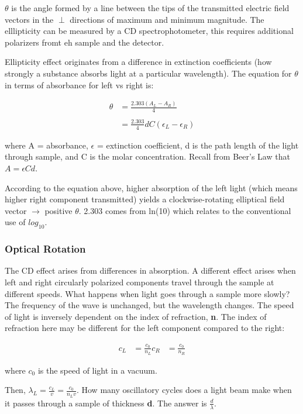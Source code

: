 \documentclass[12pt, letterpaper]{article}
\begin{document}
$\theta$ is the angle formed by a line between the tips of the transmitted electric field vectors in the $\perp$ directions of maximum and minimum magnitude. 
The elllipticity can be measured by a CD spectrophotometer, this requires additional polarizers fromt eh sample and the detector. 

\newpage

Ellipticity effect originates from a difference in extinction coefficients (how strongly a substance absorbs light at a particular wavelength). The equation for $\theta$ in terms of absorbance for left vs right is: 

\begin{align*}
    \theta &= \frac{2.303(A_L - A_R)}{4} \\ \\
    &= \frac{2.303}{4}dC(\epsilon_L - \epsilon_R)
\end{align*}

where A = absorbance, $\epsilon$ = extinction coefficient, d is the path length of the light through sample, and C is the molar concentration. Recall from Beer's Law that \( A = \epsilon C d \). 

According to the equation above, higher absorption of the left light (which means higher right component transmitted) yields a clockwise-rotating elliptical field vector $\rightarrow$ positive $\theta$. 
2.303 comes from ln(10) which relates to the conventional use of $log_{10}$. 

\subsubsection*{Optical Rotation}

The CD effect arises from differences in absorption. A different effect arises when left and right circularly polarized components travel through the sample at different speeds. 
What happens when light goes through a sample more slowly? The frequency of the wave is unchanged, but the wavelength changes. The speed of light is inversely dependent 
on the index of refraction, \textbf{n}. The index of refraction here may be different for the left component compared to the right:

\begin{align*}
    c_L &= \frac{c_0}{n_L}
    c_R &= \frac{c_0}{n_R}
\end{align*}

where $c_0$ is the speed of light in a vacuum. 

Then, \( \lambda_L = \frac{c_L}{v} = \frac{c_0}{n_L v} \). How many oscillatory cycles does a light beam make when it passes through a sample of thickness \textbf{d}. The answer is $\frac{d}{\lambda}$. 
\end{document}
